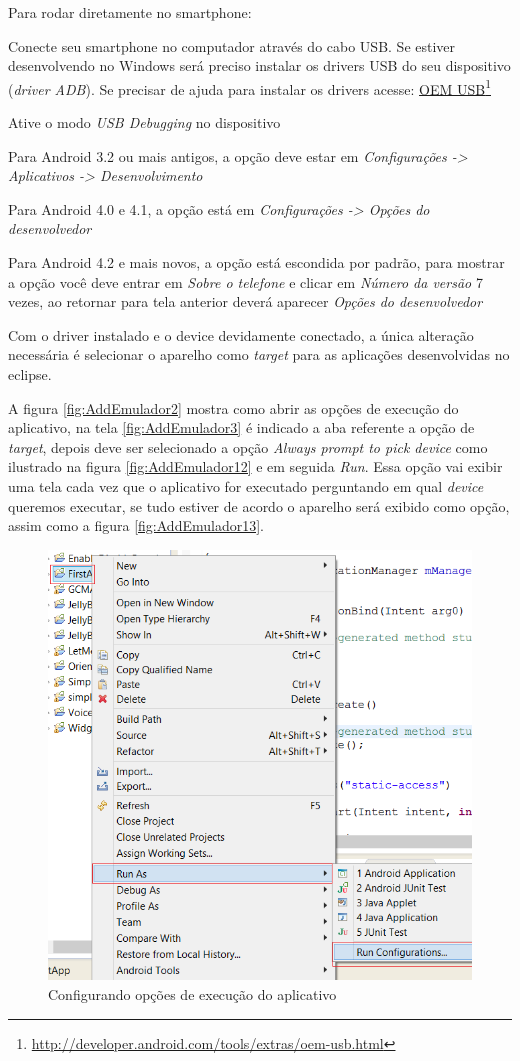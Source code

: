 \documentclass[a4paper,12pt,brazil,oneside]{book}
\begin{document}
Para rodar diretamente no smartphone:
\be
\item Conecte seu smartphone no computador através do cabo USB. Se estiver desenvolvendo no Windows será preciso instalar os drivers USB do seu dispositivo (\emph{driver ADB}). Se precisar de ajuda para instalar os drivers acesse: \href{http://developer.android.com/tools/extras/oem-usb.html}{OEM USB}\footnote{\href{http://developer.android.com/tools/extras/oem-usb.html}{http://developer.android.com/tools/extras/oem-usb.html}}
\item Ative o modo \emph{USB Debugging} no dispositivo
	\bi
	\item Para Android 3.2 ou mais antigos, a opção deve estar em \textit{Configurações -> Aplicativos	 -> Desenvolvimento}
	\item Para Android 4.0 e 4.1, a opção está em \textit{Configurações -> Opções do desenvolvedor}
	\item Para Android 4.2 e mais novos, a opção está escondida por padrão, para mostrar a opção você deve entrar em \textit{Sobre o telefone} e clicar em \textit{Número da versão} 7 vezes, ao retornar para tela anterior deverá aparecer \textit{Opções do desenvolvedor}
	\ei
\item Com o driver instalado e o device devidamente conectado, a única alteração necessária é selecionar o aparelho como \emph{target} para as aplicações desenvolvidas no eclipse.
\ee

A figura \autoref{fig:AddEmulador2} mostra como abrir as opções de execução do aplicativo, na tela \autoref{fig:AddEmulador3} é indicado a aba referente a opção de \emph{target}, depois deve ser selecionado a opção \emph{Always prompt to pick device} como ilustrado na figura \autoref{fig:AddEmulador12} e em seguida \emph{Run}.
Essa opção vai exibir uma tela cada vez que o aplicativo for executado perguntando em qual \emph{device} queremos executar, se tudo estiver de acordo o aparelho será exibido como opção, assim como a figura \autoref{fig:AddEmulador13}.

\begin{figure}[H]
  \centering
  \includegraphics[width=.7\textwidth]{figuras/emulador/AddEmulador2.png}
  \caption{Configurando opções de execução do aplicativo}
  \label{fig:AddEmulador2}
\end{figure}
\end{document}
